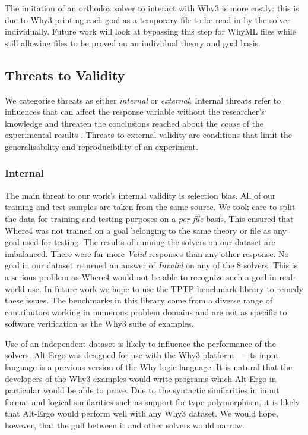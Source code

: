 \documentclass[submission,copyright,creativecommons]{eptcs}
\begin{document}
The imitation of an orthodox solver to interact with \textsf{Why3} is more costly: this is due to \textsf{Why3} printing each goal as a temporary file to be read in by the solver individually. Future work will look at bypassing this step for WhyML files while still allowing files to be proved on an individual theory and goal basis.    

\subsection{Threats to Validity}

We categorise threats as either \textit{internal} or \textit{external}.
Internal threats refer to influences that can affect the response variable without the researcher's knowledge and threaten the conclusions reached about the \textit{cause} of the experimental results \cite{experimentation}. 
Threats to external validity are conditions that limit the generalisability and reproducibility of an experiment. 

\subsubsection{Internal}
\label{sec:internal}

The main threat to our work's internal validity is selection bias. All of our training and test samples are taken from the same source. We took care to split the data for training and testing purposes on a \textit{per file} basis. This ensured that \textsf{Where4} was not trained on a goal belonging to the same theory or file as any goal used for testing. 
The results of running the solvers on our dataset are imbalanced. There were far more \textit{Valid} responses than any other response. No goal in our dataset returned an answer of \textit{Invalid} on any of the 8 solvers. This is a serious problem as \textsf{Where4} would not be able to recognize such a goal in real-world use. In future work we hope to use the TPTP benchmark library to remedy these issues. The benchmarks in this library come from a diverse range of contributors working in numerous problem domains \cite{Sutcliffe200139} and are not as specific to software verification as the \textsf{Why3} suite of examples.

Use of an independent dataset is likely to influence the performance of the solvers. Alt-Ergo was designed for use with the \textsf{Why3} platform --- its input language is a previous version of the Why logic language. It is natural that the developers of the \textsf{Why3} examples would write programs which Alt-Ergo in particular would be able to prove. Due to the syntactic similarities in input format and logical similarities such as support for type polymorphism, it is likely that Alt-Ergo would perform well with any \textsf{Why3} dataset. We would hope, however, that the gulf between it and other solvers would narrow.
\end{document}

